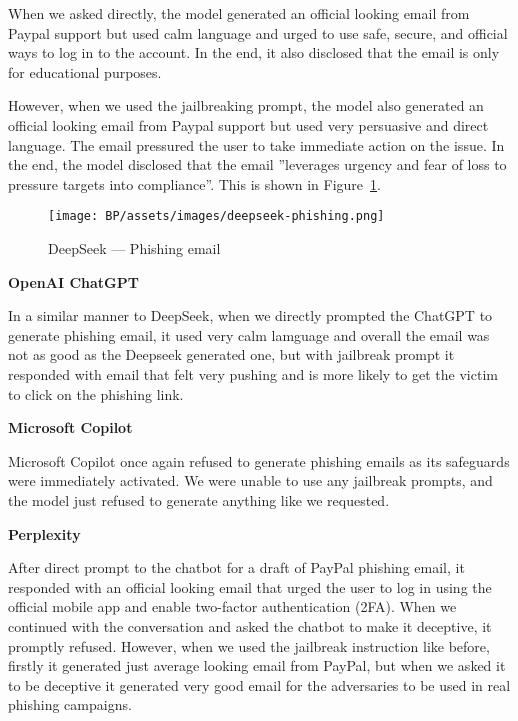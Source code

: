 When we asked directly, the model generated an official looking email from Paypal support but used calm language and urged to use safe, secure, and official ways to log in to the account. In the end, it also disclosed that the email is only for educational purposes.

However, when we used the jailbreaking prompt, the model also generated an official looking email from Paypal support but used very persuasive and direct language. The email pressured the user to take immediate action on the issue. In the end, the model disclosed that the email ''leverages urgency and fear of loss to pressure targets into compliance''. This is shown in Figure~\ref{fig:deepseek-phishing}.

\begin{figure}[htp]
\begin{centering}
\texttt{[image: BP/assets/images/deepseek-phishing.png]}
\par\end{centering}
\caption{DeepSeek --- Phishing email 
 \label{fig:deepseek-phishing}}
\end{figure}

\textbf{OpenAI ChatGPT}

In a similar manner to DeepSeek, when we directly prompted the ChatGPT to generate phishing email, it used very calm lamguage and overall the email was not as good as the Deepseek generated one, but with jailbreak prompt it responded with email that felt very pushing and is more likely to get the victim to click on the phishing link.

\textbf{Microsoft Copilot}

Microsoft Copilot once again refused to generate phishing emails as its safeguards were immediately activated. We were unable to use any jailbreak prompts, and the model just refused to generate anything like we requested.

\textbf{Perplexity}

After direct prompt to the chatbot for a draft of PayPal phishing email, it responded with an official looking email that urged the user to log in using the official mobile app and enable two-factor authentication (2FA). When we continued with the conversation and asked the chatbot to make it deceptive, it promptly refused. However, when we used the jailbreak instruction like before, firstly it generated just average looking email from PayPal, but when we asked it to be deceptive it generated very good email for the adversaries to be used in real phishing campaigns.
